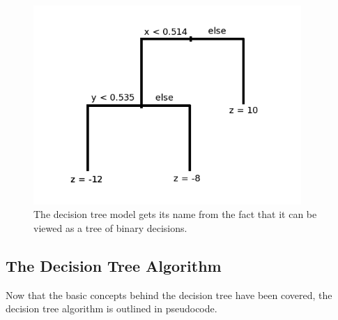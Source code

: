 \documentclass[12pt]{article}
\begin{document}
\begin{figure}[h!]
  \centering
  \includegraphics[width=4in]{imgs/BDT_tree_structure.png}
  \caption
   {The decision tree model gets its name from the fact that it can be viewed as a tree of binary decisions.}
  \label{fig:dtstruct}
\end{figure}

\newpage
\subsection{The Decision Tree Algorithm}

Now that the basic concepts behind the decision tree have been covered, the decision tree algorithm is outlined in pseudocode.
\end{document}
